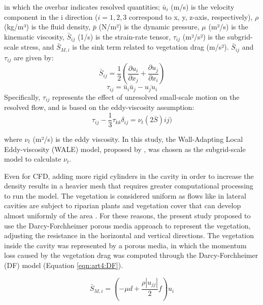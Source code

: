 in which the overbar indicates resolved quantities; $\bar{u}_i$ (m/s) is the velocity component in the i direction ($i = 1, 2, 3$ correspond to x, y, z-axis, respectively), $\rho$ (kg/m³) is the fluid density, $\bar{p}$ (N/m²) is the dynamic pressure, $\mu$ (m²/s) is the kinematic viscosity, $\bar{S}_{ij}$ (1/s) is the strain-rate tensor, $\tau_{ij}$ (m²/s²) is the subgrid-scale stress, and $\bar{S}_{M,i}$ is the sink term related to vegetation drag (m/s²). $\bar{S}_{ij}$ and $\tau_{ij}$ are given by: 
\begin{equation}
\bar{S}_{ij}=\frac{1}{2}\left (\frac{\partial u_i}{\partial x_j} +\frac{\partial u_j}{\partial x_i} \right )
\label{eqn:art4:Sij}
\end{equation}
\begin{equation}
\tau_{ij}=\bar{u}_i\bar{u}_j - \overline{u_j u_i}
\label{eqn:art4:Tij}
\end{equation}
Specifically, $\tau_{ij}$ represents the effect of unresolved small-scale motion on the resolved flow, and is based on the eddy-viscosity assumption:
\begin{equation}
\tau_{ij} - \frac{1}{3}\tau_{kk}\delta_{ij}=\nu_t(2\bar{S})ij)
\label{eqn:art4:tau}
\end{equation}

where $\nu_t$ (m²/s) is the eddy viscosity. In this study, the Wall-Adapting Local Eddy-viscosity (WALE) model, proposed by \textcite{nicoud1999}, was chosen as the subgrid-scale model to calculate $\nu_t$.

Even for CFD, adding more rigid cylinders in the cavity in order to increase the density \cite{xiang2019,xiang2020} results in a heavier mesh that requires greater computational processing to run the model. The vegetation is considered uniform as flows like in lateral cavities are subject to riparian plants and vegetation cover that can develop almost uniformly of the area \cite{sukhodolov2017}. For these reasons, the present study proposed to use the Darcy-Forchheimer porous media approach to represent the vegetation, adjusting the resistance in the horizontal and vertical directions. The vegetation inside the cavity was represented by a porous media, in which the momentum loss caused by the vegetation drag was computed through the Darcy-Forchheimer (DF) model (Equation \ref{eqn:art4:DF}). 

\begin{equation}
\bar{S}_{M,i}=\left ( -\mu d+\frac{\rho\left | u_{jj} \right |}{2}f \right )u_i
\label{eqn:art4:DF}
\end{equation}

